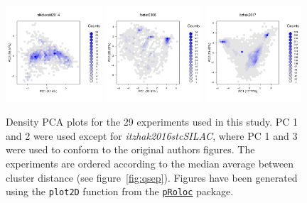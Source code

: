 \documentclass[12pt]{article}\usepackage[]{graphicx}\usepackage[]{color}
\newcommand{\Rpackage}[1]{\texttt{#1}}
\newcommand\Biocpkg[1]{%
  {\href{http://bioconductor.org/packages/#1}%
    {\Rpackage{#1}}}}
\begin{document}
\begin{appendices}
\begin{figure}[htb]
  \includegraphics[width = 0.32\textwidth]{./figure/fighexpca-26.pdf}
  \includegraphics[width = 0.32\textwidth]{./figure/fighexpca-27.pdf}
  \includegraphics[width = 0.32\textwidth]{./figure/fighexpca-28.pdf}
  \caption{Density PCA plots for the 29 experiments
    used in this study. PC 1 and 2 were used except for
    \textit{itzhak2016stcSILAC}, where PC 1 and 3 were used to conform
    to the original authors figures. The experiments are ordered
    according to the median average between cluster distance (see
    figure~\ref{fig:qsep}). Figures have been generated using the
    \texttt{plot2D} function from the \Biocpkg{pRoloc} package.}
  \ContinuedFloat
  \label{fig:denspca}
\end{figure}



\end{appendices}
\end{document}
